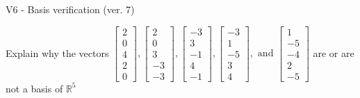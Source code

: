 \begin{exercise}
  \begin{exerciseTitle}V6 - Basis verification (ver. 7)\end{exerciseTitle}
  \begin{exerciseStatement}
    Explain why the vectors \(\left[\begin{array}{r}
2 \\
0 \\
4 \\
2 \\
0
\end{array}\right] , \left[\begin{array}{r}
2 \\
0 \\
3 \\
-3 \\
-3
\end{array}\right] , \left[\begin{array}{r}
-3 \\
3 \\
-1 \\
4 \\
-1
\end{array}\right] , \left[\begin{array}{r}
-3 \\
1 \\
-5 \\
3 \\
4
\end{array}\right] , \text{ and } \left[\begin{array}{r}
1 \\
-5 \\
-4 \\
2 \\
-5
\end{array}\right]\) are or are not a basis of \(\mathbb{R}^5\)	



\end{exerciseStatement}
\end{exercise}
